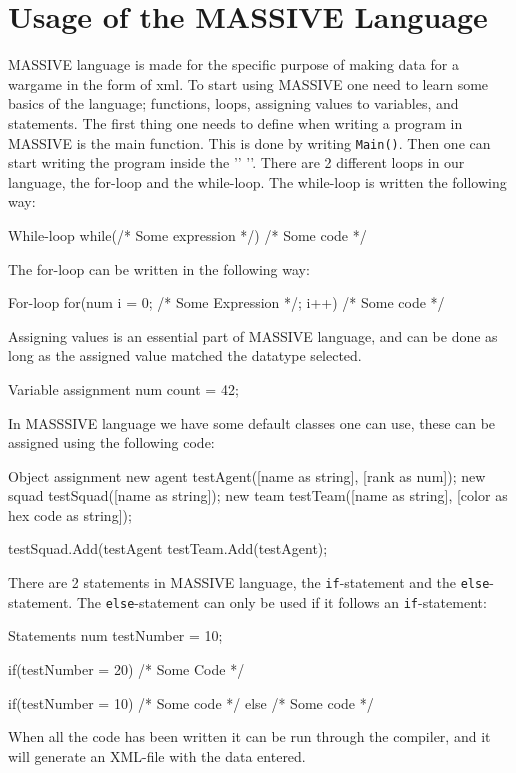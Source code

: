 \section{Usage of the MASSIVE Language}


MASSIVE language is made for the specific purpose of making data for a wargame in the form of xml.
To start using MASSIVE one need to learn some basics of the language; functions, loops, assigning values to variables, and statements.
The first thing one needs to define when writing a program in MASSIVE is the main function. This is done by writing \texttt{Main()}.
Then one can start writing the program inside the '{' '}'.
There are 2 different loops in our language, the for-loop and the while-loop. The while-loop is written the following way:
\begin{source}{While-loop}{}
while(/* Some expression */)
{
		/* Some code */
}
\end{source}

The for-loop can be written in the following way:
\begin{source}{For-loop}{}
for(num i = 0; /* Some Expression */; i++)
{
		/* Some code */
}
\end{source}

Assigning values is an essential part of MASSIVE language, and can be done as long as the assigned value matched the datatype selected.

\begin{source}{Variable assignment}{}
num count = 42;
\end{source}

In MASSSIVE language we have some default classes one can use, these can be assigned using the following code:
\begin{source}{Object assignment}{}
new agent testAgent([name as string], [rank as num]);
new squad testSquad([name as string]);
new team testTeam([name as string], [color as hex code as string]);

testSquad.Add(testAgent
testTeam.Add(testAgent);
\end{source}

There are 2 statements in MASSIVE language, the \texttt{if}-statement and the \texttt{else}-statement. The \texttt{else}-statement can only be used if it follows an \texttt{if}-statement:

\begin{source}{Statements}{}
num testNumber = 10;

if(testNumber = 20)
{
		/* Some Code */
}

if(testNumber = 10)
{
		/* Some code */
}
else
{
		/* Some code */
}
\end{source}

When all the code has been written it can be run through the compiler, and it will generate an XML-file with the data entered.